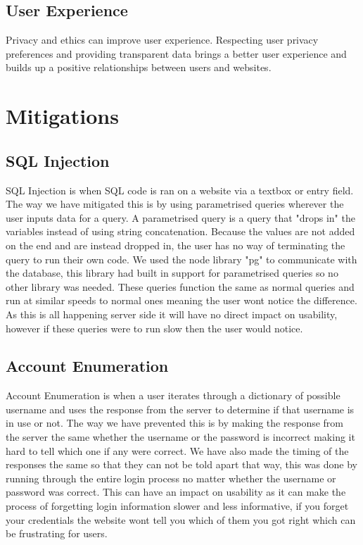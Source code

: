 \documentclass{cmpstyle}
\begin{document}
\subsection{User Experience}
Privacy and ethics can improve user experience. Respecting user privacy preferences and providing transparent data  brings a better user experience and builds up a positive relationships between users and websites.

\section{Mitigations}

\subsection{SQL Injection}
SQL Injection is when SQL code is ran on a website via a textbox or entry field. The way we have mitigated this is by using parametrised queries wherever the user inputs data for a query. A parametrised query is a query that "drops in" the variables instead of using string concatenation. Because the values are not added on the end and are instead dropped in, the user has no way of terminating the query to run their own code. We used the node library "pg" to communicate with the database, this library had built in support for parametrised queries so no other library was needed. These queries function the same as normal queries and run at similar speeds to normal ones meaning the user wont notice the difference. As this is all happening server side it will have no direct impact on usability, however if these queries were to run slow then the user would notice.
\subsection{Account Enumeration}
Account Enumeration is when a user iterates through a dictionary of possible username and uses the response from the server to determine if that username is in use or not. The way we have prevented this is by making the response from the server the same whether the username or the password is incorrect making it hard to tell which one if any were correct. We have also made the timing of the responses the same so that they can not be told apart that way, this was done by running through the entire login process no matter whether the username or password was correct. This can have an impact on usability as it can make the process of forgetting login information slower and less informative, if you forget your credentials the website wont tell you which of them you got right which can be frustrating for users.
\end{document}

